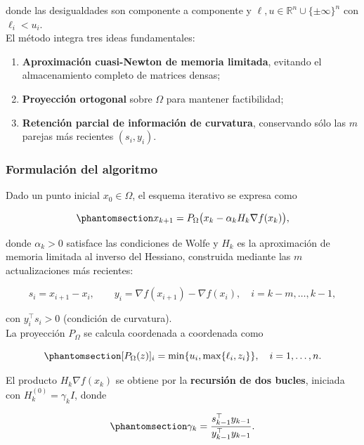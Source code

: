 \documentclass[
  spanish,
  us-letterpaper,
]{scrreprt}
\providecommand{\tightlist}{%
  \setlength{\itemsep}{0pt}\setlength{\parskip}{0pt}}
\numberwithin{equation}{section}
\begin{document}
donde las desigualdades son componente a componente y
\(\ell, u \in \mathbb{R}^n \cup \{\pm\infty\}^n\) con
\(\ell_i < u_i\).\\
El método integra tres ideas fundamentales:

\begin{enumerate}
\def\labelenumi{\arabic{enumi}.}
\tightlist
\item
  \textbf{Aproximación cuasi-Newton de memoria limitada}, evitando el
  almacenamiento completo de matrices densas;
\item
  \textbf{Proyección ortogonal} sobre \(\Omega\) para mantener
  factibilidad;
\item
  \textbf{Retención parcial de información de curvatura}, conservando
  sólo las \(m\) parejas más recientes \((s_i, y_i)\).
\end{enumerate}

\subsubsection{Formulación del
algoritmo}\label{formulaciuxf3n-del-algoritmo}

Dado un punto inicial \(x_0 \in \Omega\), el esquema iterativo se
expresa como

\begin{equation}\phantomsection\label{eq-23}{
x_{k+1} = P_\Omega\big(x_k - \alpha_k H_k \nabla f(x_k)\big),
}\end{equation}

donde \(\alpha_k > 0\) satisface las condiciones de Wolfe y \(H_k\) es
la aproximación de memoria limitada al inverso del Hessiano, construida
mediante las \(m\) actualizaciones más recientes:

\[
s_i = x_{i+1} - x_i, \qquad
y_i = \nabla f(x_{i+1}) - \nabla f(x_i), \quad i = k-m,\dots,k-1,
\]

con \(y_i^\top s_i > 0\) (condición de curvatura).\\
La proyección \(P_\Omega\) se calcula coordenada a coordenada como

\begin{equation}\phantomsection\label{eq-24}{
[P_\Omega(z)]_i = \min\{u_i, \max\{\ell_i, z_i\}\}, \quad i=1,\dots,n. 
}\end{equation}

El producto \(H_k \nabla f(x_k)\) se obtiene por la \textbf{recursión de
dos bucles}, iniciada con \(H_k^{(0)} = \gamma_k I\), donde

\begin{equation}\phantomsection\label{eq-25}{
\gamma_k = \frac{s_{k-1}^\top y_{k-1}}{y_{k-1}^\top y_{k-1}}. 
}\end{equation}
\end{document}
